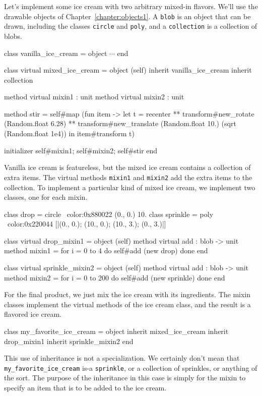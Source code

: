 Let's implement some ice cream with two arbitrary mixed-in flavors.  We'll use the drawable objects
of Chapter~\ref{chapter:objects1}.  A \hbox{\lstinline/blob/} is an object that can be drawn,
including the classes \hbox{\lstinline/circle/} and \hbox{\lstinline/poly/}, and a \hbox{\lstinline/collection/}
is a collection of blobs.

\begin{ocaml}
class vanilla_ice_cream = object $\cdots$ end

class virtual mixed_ice_cream =
object (self)
   inherit vanilla_ice_cream
   inherit collection

   method virtual mixin1 : unit
   method virtual mixin2 : unit

   method stir = self#map (fun item ->
      let t = recenter ** transform#new_rotate (Random.float 6.28)
         ** transform#new_translate (Random.float 10.) (sqrt (Random.float 1e4))
      in item#transform t)

   initializer self#mixin1; self#mixin2; self#stir
end
\end{ocaml}
%
Vanilla ice cream is featureless, but the mixed ice cream contains a collection of extra items.  The
virtual methods \hbox{\lstinline/mixin1/} and \hbox{\lstinline/mixin2/} add the extra items to the collection.  To
implement a particular kind of mixed ice cream, we implement two classes, one for each mixin.

\begin{ocaml}
class drop = circle ~color:0x880022 (0., 0.) 10.
class sprinkle = poly ~color:0x220044 [|(0., 0.); (10., 0.); (10., 3.); (0., 3.)|]

class virtual drop_mixin1 =
object (self)
   method virtual add : blob -> unit
   method mixin1 = for i = 0 to 4 do self#add (new drop) done
end

class virtual sprinkle_mixin2 =
object (self)
   method virtual add : blob -> unit
   method mixin2 = for i = 0 to 200 do self#add (new sprinkle) done
end
\end{ocaml}
%
For the final product, we just mix the ice cream with its ingredients.
The mixin classes implement the virtual methods of the ice cream class,
and the result is a flavored ice cream.

\begin{ocaml}
class my_favorite_ice_cream =
object
   inherit mixed_ice_cream
   inherit drop_mixin1
   inherit sprinkle_mixin2
end
\end{ocaml}
%
This use of inheritance is not a specialization.  We certainly don't mean
that \hbox{\lstinline/my_favorite_ice_cream/} is-a \hbox{\lstinline/sprinkle/}, or a collection of sprinkles, or
anything of the sort.  The purpose of the inheritance in this case is simply for the mixin to
specify an item that is to be added to the ice cream.

